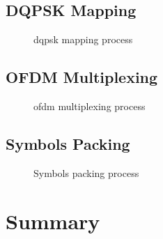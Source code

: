 \documentclass[class=report,11pt,crop=false]{standalone}
\begin{document}
\subsection{DQPSK Mapping \label{subsect:dab-proc_dqpsk-map}}

\begin{figure}[htbp]
  \centering
  \captionsetup{type=figure}
  \def\svgwidth{\linewidth}
  { %
  }
  \caption{\gls{dqpsk} mapping process}
  \label{fig:dqpsk_map}
\end{figure}

\subsection{OFDM Multiplexing \label{subsect:dab-proc_ofdm-mux}}

\begin{figure}[htbp]
  \centering
  \captionsetup{type=figure}
  \def\svgwidth{\linewidth}
  { %
  }
  \caption{\gls{ofdm} multiplexing process}
  \label{fig:ofdm_mux}
\end{figure}

\subsection{Symbols Packing \label{subsect:dab-proc_symbols-pack}}

\begin{figure}[htbp]
  \centering
  \captionsetup{type=figure}
  \def\svgwidth{\linewidth}
  { %
  }
  \caption{Symbols packing process}
  \label{fig:symbols_pack}
\end{figure}

\section{Summary}

\ifstandalone

\printnoidxglossary[type=\acronymtype,nonumberlist]
\fi
\end{document}
